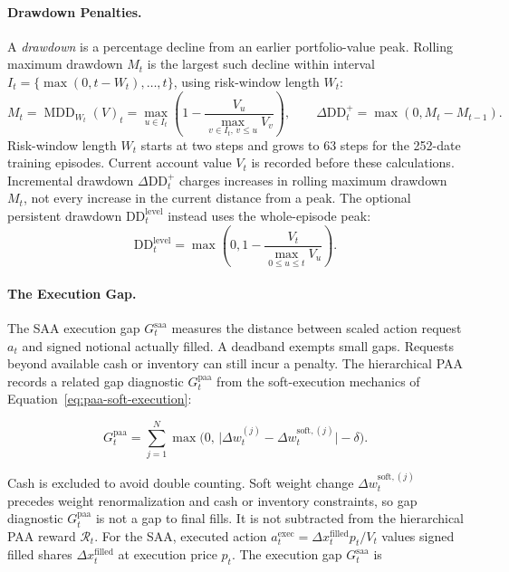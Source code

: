 \paragraph{Drawdown Penalties.}
\label{sec:drawdown}

A \emph{drawdown} is a percentage decline from an earlier portfolio-value peak. Rolling maximum drawdown \(M_t\) is the largest such decline within interval \(I_t=\{\max(0,t-W_t),\dots,t\}\), using risk-window length \(W_t\):
\begin{equation}
M_t=\operatorname{MDD}_{W_t}(V)_t
=\max_{u\in I_t}\left(1-\frac{V_u}{\max_{v\in I_t,\,v\leq u}V_v}\right),\qquad
\Delta\text{DD}_t^{+}=\max(0,M_t-M_{t-1}).
\label{eq:rolling-drawdown}
\end{equation}
Risk-window length \(W_t\) starts at two steps and grows to 63 steps for the 252-date training episodes. Current account value \(V_t\) is recorded before these calculations. Incremental drawdown \(\Delta\mathrm{DD}_t^+\) charges increases in rolling maximum drawdown \(M_t\), not every increase in the current distance from a peak. The optional persistent drawdown \(\mathrm{DD}_t^{\mathrm{level}}\) instead uses the whole-episode peak:
\begin{equation}
\mathrm{DD}_t^{\mathrm{level}}=\max\!\left(0,1-\frac{V_t}{\max_{0\leq u\leq t}V_u}\right).
\label{eq:drawdown-level}
\end{equation}

\paragraph{The Execution Gap.}
\label{sec:execgap}

The SAA execution gap \(G_t^{\mathrm{saa}}\) measures the distance between scaled action request \(a_t\) and signed notional actually filled. A deadband exempts small gaps. Requests beyond available cash or inventory can still incur a penalty. The hierarchical PAA records a related gap diagnostic \(G_t^{\mathrm{paa}}\) from the soft-execution mechanics of Equation~\eqref{eq:paa-soft-execution}:

\begin{equation}
G_t^{\text{paa}} = \sum_{j=1}^{N} \max\big(0,\, \lvert \Delta w_t^{(j)} - \Delta w_t^{\text{soft},(j)} \rvert - \delta\big).
\label{eq:execution-gap-paa}
\end{equation}

Cash is excluded to avoid double counting. Soft weight change \(\Delta w_t^{\mathrm{soft},(j)}\) precedes weight renormalization and cash or inventory constraints, so gap diagnostic \(G_t^{\mathrm{paa}}\) is not a gap to final fills. It is not subtracted from the hierarchical PAA reward \(\mathcal R_t\). For the SAA, executed action \(a_t^{\mathrm{exec}}=\Delta x_t^{\mathrm{filled}}p_t/V_t\) values signed filled shares \(\Delta x_t^{\mathrm{filled}}\) at execution price \(p_t\). The execution gap \(G_t^{\mathrm{saa}}\) is

